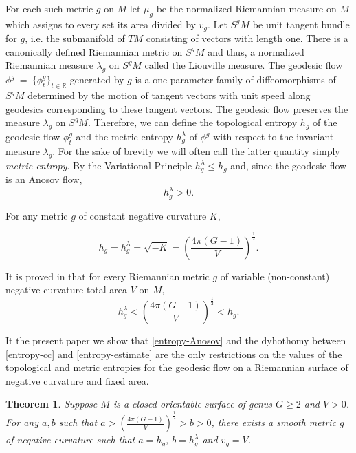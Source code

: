 \documentclass[12pt]{article}
\numberwithin{equation}{section}
\newtheorem{thm}{Theorem}
\theoremstyle{definition}
\begin{document}
For each such metric $g$ on $M$ let  $\mu_g$ be the normalized Riemannian measure  on $M$ which assigns to every set its area divided by $v_g$. Let  $S^gM$ be unit tangent bundle for $g$, i.e. the submanifold of $TM$ consisting of vectors with length one. There is a canonically defined Riemannian metric on $S^gM$ and thus, a normalized Riemannian measure $\lambda_g$ on $S^gM$ called the Liouville measure. The geodesic flow~$\phi^g~=~\{\phi^g_t\}_{t \in \mathbb{R}}$ generated by $g$ is a one-parameter family of diffeomorphisms of $S^gM$ determined by the motion of tangent vectors with unit speed along geodesics corresponding to these tangent vectors. The geodesic flow preserves the measure $\lambda_g$ on $S^gM$. Therefore, we can define the topological entropy $h_g$ of the geodesic flow $\phi^g_t$ and the metric entropy $h^\lambda_g$ of $\phi^g$ with respect to the invariant measure $\lambda_g$. For the sake of  brevity we will often  call the latter quantity  simply {\em metric entropy}. By the Variational Principle $h^\lambda_g\le h_g$ and, since the geodesic flow is an Anosov flow,
\begin{equation}\label{entropy-Anosov}
h^\lambda_g>0.
\end{equation}

For any metric $g$ of constant negative curvature $K$, 

\begin{equation}\label{entropy-cc}
h_g=h_g^{\lambda}=\sqrt {-K} =\left(\frac{4\pi(G-1)}{V}\right)^{\frac{1}{2}}.
\end{equation}

It is proved in  \cite{K82} 
that for every Riemannian metric $g$ of variable (non-constant) negative curvature  total area  $V$ on $M$, 
\begin{equation}\label{entropy-estimate}
h_g^{\lambda}<\left(\frac{4\pi(G-1)}{V}\right)^{\frac{1}{2}}<h_g.
\end{equation}


It the present paper we show that \eqref{entropy-Anosov} and the dyhothomy between \eqref{entropy-cc} and \eqref{entropy-estimate}  are the only restrictions on the values of the topological and metric entropies for the geodesic flow on a Riemannian surface of negative curvature and fixed area. 

\begin{thm} \label{mainthm}
Suppose $M$ is a closed orientable surface of genus $G\geq 2$ and $V>0$. For any $a, b$ such that $a>\left(\frac{4\pi(G-1)}{V}\right)^{\frac{1}{2}}>b>0$, there exists a smooth metric $g$ of negative curvature such that $a = h_g$, $b = h_g^\lambda$ and $v_g = V$.
\end{thm}
\end{document}
